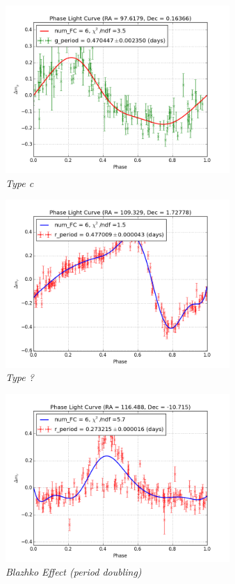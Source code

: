 \documentclass[aps,prb,twocolumn,superscriptaddress]{revtex4-1}
\begin{document}
	\begin{figure}[!]
	 \centering
	 	\includegraphics[width=3.35in]{figures/FSP1_g_LC_rrrtest_p5_grp7.png}
	 \caption{\it \small{Type c}}
	 \label{fig:Typec}
	\end{figure}
	
	\begin{figure}[!]
	 \centering
	 	\includegraphics[width=3.35in]{figures/rPLCneg45E_limit2_grp_109+01_09693.png}
	 \caption{\it \small{Type ?}}
	 \label{fig:Typeq}
	\end{figure}

	\begin{figure}[!]
	 \centering
	 	\includegraphics[width=3.35in]{figures/rPLCneg45E_limit2_grp_116-11_03117.png}
	 \caption{\it \small{Blazhko Effect (period doubling)}}
	 \label{fig:Blazhko}
	\end{figure}
\end{document}
